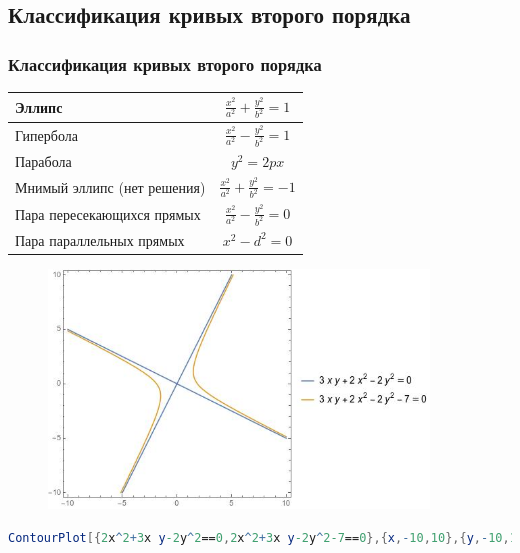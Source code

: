 \documentclass[10pt]{beamer}
\begin{document}
    \subsection{Классификация кривых второго порядка}
    \begin{frame}
        \frametitle{Классификация кривых второго порядка}
        \begin{center}
            \begin{tabular}{|l|c|}
                \hline
                Эллипс & $ \frac{x^2}{a^2} + \frac{y^2}{b^2} = 1$ \\
                \hline
                Гипербола & $ \frac{x^2}{a^2} - \frac{y^2}{b^2} = 1$ \\
                \hline
                Парабола & $ y^2 = 2px $ \\
                \hline
                Мнимый эллипс (нет решения) & $ \frac{x^2}{a^2} + \frac{y^2}{b^2} = -1$ \\
                \hline
                Пара пересекающихся прямых & $ \frac{x^2}{a^2} - \frac{y^2}{b^2} = 0$ \\
                \hline
                Пара параллельных прямых & $ x^2 - d^2 = 0$ \\
                \hline
            \end{tabular}
        \end{center}
    \end{frame}

    \begin{frame}[fragile]
        \begin{figure}
            \includegraphics[width=0.9\textwidth]{classification.jpg}
        \end{figure}
        \begin{lstlisting}[language=Mathematica]
            ContourPlot[{2x^2+3x y-2y^2==0,2x^2+3x y-2y^2-7==0},{x,-10,10},{y,-10,10},PlotLegends->"Expressions"]
        \end{lstlisting}
    \end{frame}
\end{document}
